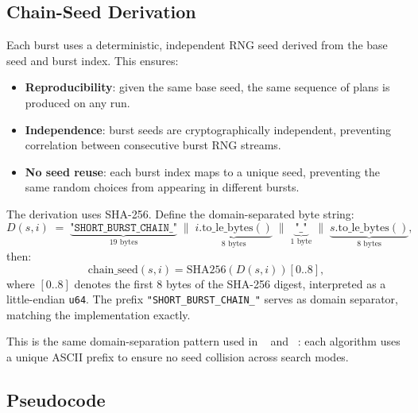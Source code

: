 \subsection{Chain-Seed Derivation}

Each burst uses a deterministic, independent RNG seed derived from the
base seed and burst index.
This ensures:
\begin{itemize}
\item \textbf{Reproducibility}: given the same base seed, the same
      sequence of plans is produced on any run.
\item \textbf{Independence}: burst seeds are cryptographically independent,
      preventing correlation between consecutive burst RNG streams.
\item \textbf{No seed reuse}: each burst index maps to a unique seed,
      preventing the same random choices from appearing in different bursts.
\end{itemize}

The derivation uses SHA-256.
Define the domain-separated byte string:
\[
  D(s, i) \;=\;
    \underbrace{\texttt{"SHORT\_BURST\_CHAIN\_"}}_{\text{19 bytes}}
    \;\|\;
    \underbrace{i.\mathrm{to\_le\_bytes}()}_{\text{8 bytes}}
    \;\|\;
    \underbrace{\texttt{"\_"}}_{\text{1 byte}}
    \;\|\;
    \underbrace{s.\mathrm{to\_le\_bytes}()}_{\text{8 bytes}},
\]
then:
\[
  \mathrm{chain\_seed}(s, i) = \mathrm{SHA256}(D(s, i))[0..8],
\]
where $[0..8]$ denotes the first 8 bytes of the SHA-256 digest,
interpreted as a little-endian \texttt{u64}.
The prefix \texttt{"SHORT\_BURST\_CHAIN\_"} serves as domain separator,
matching the implementation exactly.

This is the same domain-separation pattern used in \be{}~\citep{h1paper}
and \cs{}~\citep{b16paper}: each algorithm uses a unique ASCII prefix
to ensure no seed collision across search modes.

\subsection{Pseudocode}

